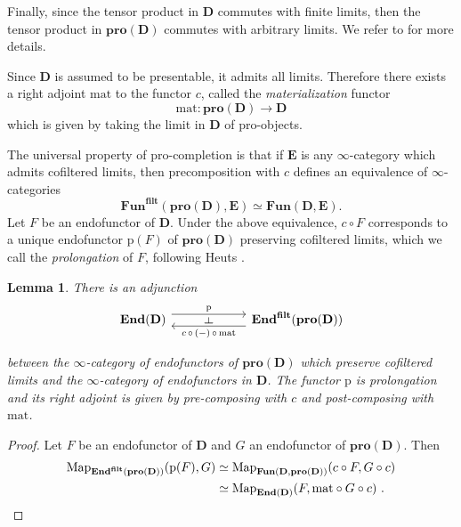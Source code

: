 \documentclass{proc-l}
\theoremstyle{plain}
\newtheorem{lemma}[{theorem}]{Lemma}
\theoremstyle{definition}
\theoremstyle{remark}
\begin{document}
Finally, since the tensor product in $\mathbf{D}$ commutes with finite limits, then the tensor product in $\mathbf{pro}(\mathbf{D})$ commutes with arbitrary limits. We refer to \cite[Section 5]{bachmann2024} for more details.

Since $\mathbf{D}$ is assumed to be presentable, it admits all limits. Therefore there exists a right adjoint $\mathrm{mat}$ to the functor $c$, called the \textit{materialization} functor
\[
\mathrm{mat}: \mathbf{pro}(\mathbf{D}) \longrightarrow \mathbf{D}
\]
which is given by taking the limit in $\mathbf{D}$ of pro-objects.

The universal property of pro-completion is that if $\mathbf E$ is any  $\infty$-category which admits cofiltered limits, then precomposition with $c$ defines an equivalence of $\infty$-categories
\[
\mathbf{Fun}^{\mathbf{filt}}(\mathbf{pro}(\mathbf D),\mathbf E) \simeq \mathbf{Fun}(\mathbf D,\mathbf E).
\]
Let $F$ be an endofunctor of $\mathbf D$. Under the above equivalence, $c \circ F$ corresponds to a unique endo\-functor $\mathrm p (F)$ of $\mathbf{pro}(\mathbf{D})$ preserving cofiltered limits, which we call the \emph{prolongation} of $F$, following Heuts \cite[Appendix A]{heuts2024}.

\begin{lemma}%
\label{Lemma:3.4}There is an adjunction
\[
\begin{tikzcd}[column sep=5pc,row sep=3pc]
\mathbf{End}(\mathbf{D})\arrow[r,"\mathrm{p}"{name=F},shift left=1.1ex ] &\mathbf{End}^{\mathbf{filt}}(\mathbf{pro}(\mathbf{D})) \arrow[l,"c \,\circ \,(-)\, \circ\, \mathrm{mat}"{name=U},shift left=1.1ex ]
\arrow[phantom, from=F, to=U, , "\dashv" rotate=-90]
\end{tikzcd}
\]

between the $\infty$-category of endofunctors of $\mathbf{pro}(\mathbf{D})$ which preserve cofiltered limits and the $\infty$-category of endofunctors in $\mathbf{D}$. The functor $\mathrm{p}$ is prolongation and its right adjoint is given by pre-composing with $c$ and post-composing with $\mathrm{mat}$.
\end{lemma}

\begin{proof}
Let $F$ be an endofunctor of $\mathbf{D}$ and $G$ an endofunctor of $\mathbf{pro}(\mathbf{D})$. Then
\begin{align*}
\mathrm{Map}_{\mathbf{End}^{\mathbf{filt}}(\mathbf{pro}(\mathbf{D}))}(\mathrm{p}(F),G) &\simeq \mathrm{Map}_{\mathbf{Fun}(\mathbf{D},\mathbf{pro}(\mathbf{D}))}(c \circ F ,G \circ c) \\
&\simeq \mathrm{Map}_{\mathbf{End}(\mathbf{D})}(F,\mathrm{mat} \circ G \circ c)~. \qedhere
\end{align*}
\end{proof}
\end{document}
